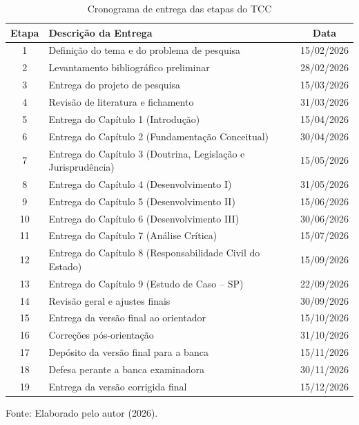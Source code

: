 \documentclass[12pt,a4paper]{article}
\begin{document}
\begin{table}[H]
\centering
\begin{tabular}{|c|p{8cm}|c|}
\hline
\textbf{Etapa} & \textbf{Descrição da Entrega} & \textbf{Data} \\
\hline
1 & Definição do tema e do problema de pesquisa & 15/02/2026 \\
\hline
2 & Levantamento bibliográfico preliminar & 28/02/2026 \\
\hline
3 & Entrega do projeto de pesquisa & 15/03/2026 \\
\hline
4 & Revisão de literatura e fichamento & 31/03/2026 \\
\hline
5 & Entrega do Capítulo 1 (Introdução) & 15/04/2026 \\
\hline
6 & Entrega do Capítulo 2 (Fundamentação Conceitual) & 30/04/2026 \\
\hline
7 & Entrega do Capítulo 3 (Doutrina, Legislação e Jurisprudência) & 15/05/2026 \\
\hline
8 & Entrega do Capítulo 4 (Desenvolvimento I) & 31/05/2026 \\
\hline
9 & Entrega do Capítulo 5 (Desenvolvimento II) & 15/06/2026 \\
\hline
10 & Entrega do Capítulo 6 (Desenvolvimento III) & 30/06/2026 \\
\hline
11 & Entrega do Capítulo 7 (Análise Crítica) & 15/07/2026 \\
\hline
12 & Entrega do Capítulo 8 (Responsabilidade Civil do Estado) & 15/09/2026 \\
\hline
13 & Entrega do Capítulo 9 (Estudo de Caso -- SP) & 22/09/2026 \\
\hline
14 & Revisão geral e ajustes finais & 30/09/2026 \\
\hline
15 & Entrega da versão final ao orientador & 15/10/2026 \\
\hline
16 & Correções pós-orientação & 31/10/2026 \\
\hline
17 & Depósito da versão final para a banca & 15/11/2026 \\
\hline
18 & Defesa perante a banca examinadora & 30/11/2026 \\
\hline
19 & Entrega da versão corrigida final & 15/12/2026 \\
\hline
\end{tabular}
\caption{Cronograma de entrega das etapas do TCC}
\label{tab:cronograma}
\par\medskip
Fonte: Elaborado pelo autor (2026).
\end{table}
\end{document}

